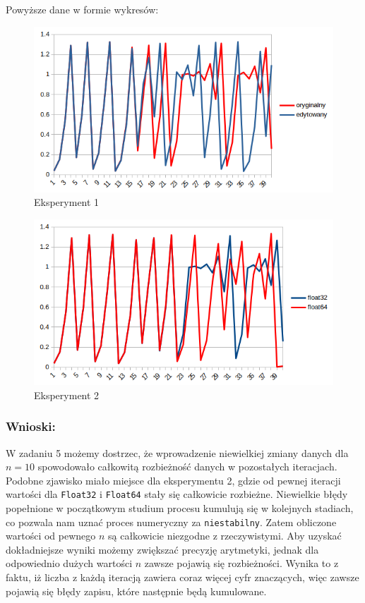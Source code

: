 \documentclass[12pt]{article}
\begin{document}
\clearpage
Powyższe dane w formie wykresów:
\begin{figure}[!htb]
	\centering
 	 \includegraphics[width=.7\linewidth]{plot_zad5_2.png}
 	 \caption{Eksperyment 1}
 	 \label{fig:figure4}
\end{figure}
\begin{figure}[!htb]
  	\centering
	\includegraphics[width=.7\linewidth]{plot_zad5_1.png}
  	\caption{Eksperyment 2}
	 \label{fig:figure5}
\end{figure}

\subsubsection*{Wnioski:}
W zadaniu 5 możemy dostrzec, że wprowadzenie niewielkiej zmiany danych dla $n=10$ spowodowało całkowitą rozbieżność danych w pozostałych iteracjach. Podobne zjawisko miało miejsce dla eksperymentu 2, gdzie od pewnej iteracji wartości dla \texttt{Float32} i \texttt{Float64} stały się całkowicie rozbieżne. 
 Niewielkie błędy popełnione w początkowym studium procesu kumulują się w kolejnych stadiach, co pozwala nam uznać proces numeryczny za \texttt{niestabilny}. Zatem obliczone wartości od pewnego $n$ są całkowicie niezgodne z rzeczywistymi. Aby uzyskać dokładniejsze wyniki możemy zwiększać precyzję arytmetyki, jednak dla odpowiednio dużych wartości $n$ zawsze pojawią się rozbieżności. Wynika to z faktu, iż liczba z każdą iteracją zawiera coraz więcej cyfr znaczących, więc zawsze pojawią się błędy zapisu, które następnie będą kumulowane.
\end{document}
